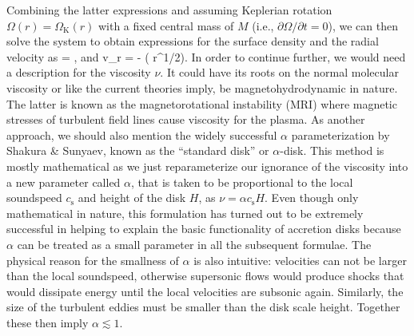 Combining the latter expressions and assuming Keplerian rotation $\Omega(r) = \Omega_{\mathrm{K}}(r)$ with a fixed central mass of $M$ (i.e., $\partial\Omega/\partial t = 0$), we can then solve the system to obtain expressions for the surface density and the radial velocity as
\be\label{eq:disk_st_1}
 =   ,
\ee
and
\be\label{eq:disk_st_2}
v_r = -  ( \nu \Sigma r^{1/2}).
\ee
In order to continue further, we would need a description for the viscosity $\nu$.
It could have its roots on the normal molecular viscosity\cite{ChapmanCowling52} or like the current theories imply, be magnetohydrodynamic in nature.
The latter is known as the magnetorotational instability (MRI) where magnetic stresses of turbulent field lines cause viscosity for the plasma. \cite{Velikhov59, Cha60, BH91} 
As another approach, we should also mention the widely successful $\alpha$ parameterization by Shakura \& Sunyaev, known as the ``standard disk'' or $\alpha$-disk.\cite{SS73}
This method is mostly mathematical as we just reparameterize our ignorance of the viscosity into a new parameter called $\alpha$, that is taken to be proportional to the local soundspeed $c_{\mathrm{s}}$ and height of the disk $H$, as $\nu = \alpha c_{\mathrm{s}} H$.
Even though only mathematical in nature, this formulation has turned out to be extremely successful in helping to explain the basic functionality of accretion disks because $\alpha$ can be treated as a small parameter in all the subsequent formulae.
The physical reason for the smallness of $\alpha$ is also intuitive: velocities can not be larger than the local soundspeed, otherwise supersonic flows would produce shocks that would dissipate energy until the local velocities are subsonic again.
Similarly, the size of the turbulent eddies must be smaller than the disk scale height. 
Together these then imply $\alpha \lesssim 1$.

